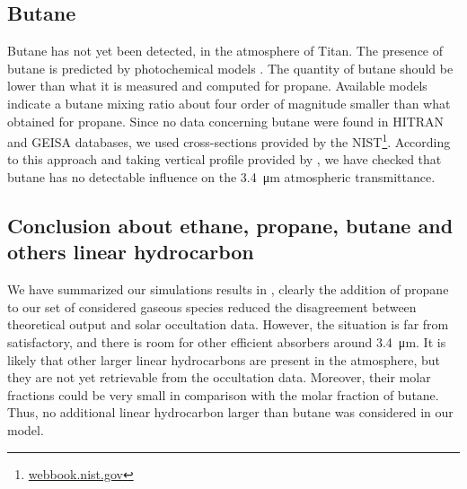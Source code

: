 \documentclass{arxiv-icarus}
\begin{document}
\subsection{Butane}

Butane has not yet been detected, in the atmosphere of Titan. The presence of butane is predicted by photochemical models \citep{Krasnopolsky2009,Krasnopolsky2010,Krasnopolsky2014}. The quantity of butane should be lower than what it is measured and computed for propane. Available models indicate a butane mixing ratio about four order of magnitude smaller than what \cite{Krasnopolsky2014} obtained for propane.
Since no data concerning butane were found in HITRAN and GEISA databases, we used cross-sections provided by the NIST\footnote{\href{http://webbook.nist.gov}{webbook.nist.gov}}. According to this approach and taking vertical profile provided by \cite{Krasnopolsky2014}, we have checked that butane has no detectable influence on the \SI{3.4}{\um} atmospheric transmittance.


\subsection{Conclusion about ethane, propane, butane and others linear hydrocarbon}

We have summarized our simulations results in , clearly the addition of propane to our set of considered gaseous species reduced the disagreement between theoretical output and solar occultation data. However, the situation is far from satisfactory, and there is room for other efficient absorbers around \SI{3.4}{\um}.
It is likely that other larger linear hydrocarbons are present in the atmosphere, but they are not yet retrievable from the occultation data. Moreover, their molar fractions could be very small in comparison with the molar fraction of butane. Thus, no additional linear hydrocarbon larger than butane was considered in our model.
\end{document}
